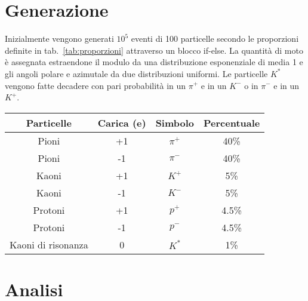 \documentclass[a4paper,10pt,twocolumn]{article}
\begin{document}
\section{Generazione}
Inizialmente vengono generati $10^5$ eventi di 100 particelle secondo le proporzioni definite in tab.~\ref{tab:proporzioni} attraverso un blocco if-else. La quantità di moto è assegnata estraendone il modulo da una distribuzione esponenziale di media 1 e gli angoli polare e azimutale da due distribuzioni uniformi. Le particelle $K^*$ vengono fatte decadere con pari probabilità in un $\pi^+$ e in un $K^-$ o in $\pi^-$ e in un $K^+$.

\begin{table*}
  \caption{Particelle generate dal programma con le rispettive proporzioni}
  \label{tab:proporzioni}
  \centering
  \begin{tabular}{cccc}
    \toprule
    Particelle         & Carica (e) & Simbolo & Percentuale \\
    \midrule
    Pioni              & +1         & $\pi^+$ & 40\%        \\
    Pioni              & -1         & $\pi^-$ & 40\%        \\
    Kaoni              & +1         & $K^+$   & 5\%         \\
    Kaoni              & -1         & $K^-$   & 5\%         \\
    Protoni            & +1         & $p^+$   & 4.5\%       \\
    Protoni            & -1         & $p^-$   & 4.5\%       \\
    Kaoni di risonanza & 0          & $K^*$   & 1\%         \\
    \bottomrule
  \end{tabular}
\end{table*}

\section{Analisi}
\end{document}
